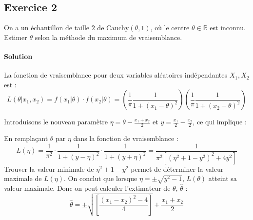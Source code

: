 \documentclass[../main.tex]{subfiles}
\begin{document}
\begin{CJK*}{UTF8}{gbsn}

\section*{Exercice 2}

On a un échantillon de taille $2$ de $\text{Cauchy}(\theta, 1)$, où le centre $\theta \in \mathbb{R}$ est inconnu.
Estimer $\theta$ selon la méthode du maximum de vraisemblance. 

\paragraph{Solution}
La fonction de vraisemblance pour deux variables aléatoires indépendantes $X_1, X_2$ est :
\begin{equation*}
L(\theta | x_1, x_2) = f(x_1 | \theta) \cdot f(x_2 | \theta) = \left( \frac{1}{\pi} \frac{1}{1 + (x_1 - \theta)^2} \right) \left( \frac{1}{\pi} \frac{1}{1 + (x_2 - \theta)^2} \right)
\end{equation*}

Introduisons le nouveau paramètre $\eta = \theta - \frac{x_1 + x_2}{2}$ et $y = \frac{x_1}{2} - \frac{x_2}{2} $, ce qui implique :

En remplaçant $\theta$ par $\eta$ dans la fonction de vraisemblance :
\begin{equation*}
L(\eta) =\frac{1}{\pi^2} \cdot \frac{1}{1 + (y - \eta)^2} \cdot \frac{1}{1 + (y + \eta)^2} = \frac{1}{\pi^2 \left[(\eta^2 + 1 - y^2)^2 + 4y^2\right]}
\end{equation*}
Trouver la valeur minimale de \(\eta^2 + 1 - y^2\) permet de déterminer la valeur maximale de \(L(\eta)\).
On conclut que lorsque \(\eta = \pm \sqrt{y^2 - 1}\), \(L(\theta)\) atteint sa valeur maximale.
Donc on peut calculer l’extimateur de $\theta$, $\hat{\theta}$ :
\begin{equation*}
\hat{\theta} = \pm \sqrt{\left[\frac{(x_1 - x_2)^2 - 4}{4}\right]} + \frac{x_1 + x_2}{2}
\end{equation*}

\end{CJK*}
\end{document}
